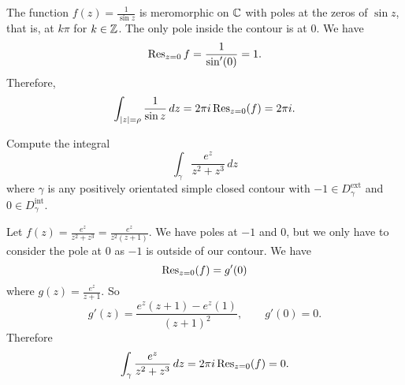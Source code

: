 \begin{solution}
    The function $f(z) = \frac{1}{\sin z}$ is meromorphic on $\mathbb{C}$ with poles at the zeros of
    $\sin z$, that is, at $k\pi$ for $k\in \mathbb{Z}$.
    The only pole inside the contour is at $0$.
    We have
    \[
        \operatorname{Res}_{z=0} f = \frac{1}{\sin'(0)} = 1.
    \]
    Therefore, 
    \[
        \int_{\left\lvert z\right\rvert = \rho} \frac{1}{\sin z} \,dz = 2\pi i \operatorname{Res}_{z=0}(f) = 2\pi i.
    \]
\end{solution}

\begin{example}
    Compute the integral
    \[
        \int_\gamma \frac{e^z}{z^2 + z^3} \,dz
    \]
    where $\gamma$ is any positively orientated simple closed contour
    with $-1 \in D^\text{ext}_\gamma$ and $0 \in D^\text{int}_\gamma$.
\end{example}

\begin{solution}
    Let 
    $f(z) = \frac{e^z}{z^2 + z^3} = \frac{e^z}{z^2(z + 1)}$.
    We have poles at $-1$ and $0$, but we only have to consider the pole at $0$
    as $-1$ is outside of our contour.
    We have
    \[
        \operatorname{Res}_{z=0} (f) = g'(0)
    \]
    where $g(z) = \frac{e^z}{z+1}$.
    So
    \[
        g'(z) = \frac{e^z(z+1) - e^z(1)}{(z+1)^2}, \qquad g'(0) = 0. 
    \]
    Therefore
    \[
        \int_\gamma \frac{e^z}{z^2 + z^3} \,dz
        = 2\pi i \operatorname{Res}_{z=0}(f)
        = 0.
    \]
\end{solution}
